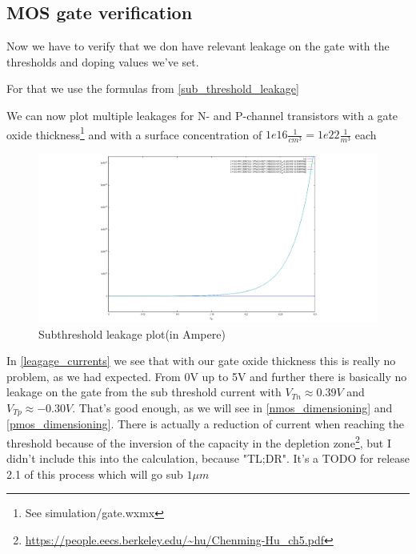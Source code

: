 \subsection{MOS gate verification}\label{gate_verify}
Now we have to verify that we don have relevant leakage on the gate with the thresholds and doping values we've set.

For that we use the formulas from \autoref{sub_threshold_leakage}

We can now plot multiple leakages for N- and P-channel transistors with a gate oxide thickness\footnote{See simulation/gate.wxmx} and with a surface concentration of $1e16\frac{1}{cm^3}=1e22\frac{1}{m^3}$ each
\begin{figure}[H]
	\centering
	\includegraphics[width=\textwidth]{subthreshold_leagage.png}
	\caption{Subthreshold leakage plot(in Ampere)}
	\label{leagage_currents}
\end{figure}
In \autoref{leagage_currents} we see that with our gate oxide thickness this is really no problem, as we had expected.
From 0V up to 5V and further there is basically no leakage on the gate from the sub threshold current with $V_{Tn} \approx 0.39V$ and $V_{Tp} \approx -0.30V$.
That's good enough, as we will see in \autoref{nmos_dimensioning} and \autoref{pmos_dimensioning}.
There is actually a reduction of current when reaching the threshold because of the inversion of the capacity in the depletion zone\footnote{\url{https://people.eecs.berkeley.edu/~hu/Chenming-Hu_ch5.pdf}}, but I didn't include this into the calculation, because "TL;DR".
It's a TODO for release 2.1 of this process which will go sub $1 \mu m$